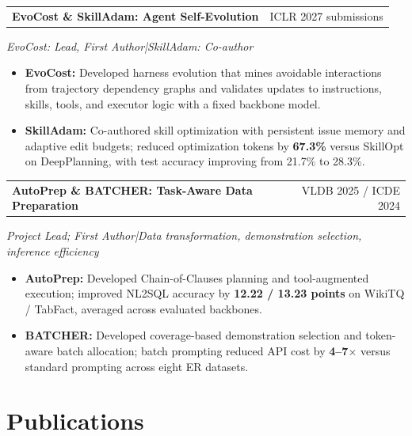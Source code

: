 \documentclass[a4paper,10pt]{article}
\makeatletter
\newcommand{\project}[3]{%
  \needspace{5\baselineskip}\vspace{3pt}
  \begin{tabularx}{\linewidth}{@{}Xr@{}}
  \textbf{#1} & {\small\color{navy}#2}
  \end{tabularx}\par
  {\small\itshape\color{muted}#3}\par
}
\makeatother
\begin{document}
\project{EvoCost \& SkillAdam: Agent Self-Evolution}{ICLR 2027 submissions}
{EvoCost: Lead, First Author\quad|\quad SkillAdam: Co-author}

\begin{itemize}
  \item \textbf{EvoCost:} Developed harness evolution that mines avoidable interactions from trajectory dependency graphs and validates updates to instructions, skills, tools, and executor logic with a fixed backbone model.
  \item \textbf{SkillAdam:} Co-authored skill optimization with persistent issue memory and adaptive edit budgets; reduced optimization tokens by \textbf{67.3\%} versus SkillOpt on DeepPlanning, with test accuracy improving from 21.7\% to 28.3\%.
\end{itemize}

\project{AutoPrep \& BATCHER: Task-Aware Data Preparation}{VLDB 2025 / ICDE 2024}
{Project Lead; First Author\quad|\quad Data transformation, demonstration selection, inference efficiency}

\begin{itemize}
  \item \textbf{AutoPrep:} Developed Chain-of-Clauses planning and tool-augmented execution; improved NL2SQL accuracy by \textbf{12.22 / 13.23 points} on WikiTQ / TabFact, averaged across evaluated backbones.
  \item \textbf{BATCHER:} Developed coverage-based demonstration selection and token-aware batch allocation; batch prompting reduced API cost by \textbf{4--7$\times$} versus standard prompting across eight ER datasets.
\end{itemize}

\section{Publications}
\end{document}
